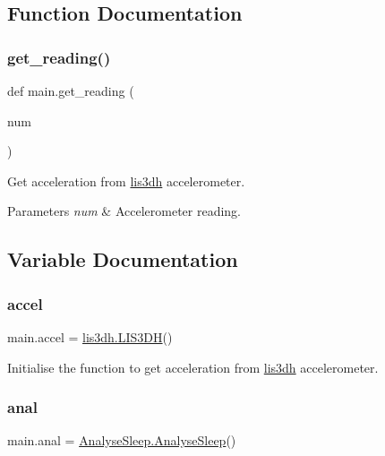\subsection{Function Documentation}
\mbox{\label{namespacemain_a8c1b4e8df74031b6ee2d0809895a7c87}} 
\subsubsection{\texorpdfstring{get\+\_\+reading()}{get\_reading()}}
{\footnotesize\ttfamily def main.\+get\+\_\+reading (\begin{DoxyParamCaption}\item[{}]{num }\end{DoxyParamCaption})}



Get acceleration from \mbox{\hyperlink{namespacelis3dh}{lis3dh}} accelerometer. 


\begin{DoxyParams}{Parameters}
{\em num} & Accelerometer reading. \\
\hline
\end{DoxyParams}


\subsection{Variable Documentation}
\mbox{\label{namespacemain_a8c8a40da45fbdc94330d48c7ed3ace09}} 
\subsubsection{\texorpdfstring{accel}{accel}}
{\footnotesize\ttfamily main.\+accel = \mbox{\hyperlink{classlis3dh_1_1_l_i_s3_d_h}{lis3dh.\+L\+I\+S3\+DH}}()}



Initialise the function to get acceleration from \mbox{\hyperlink{namespacelis3dh}{lis3dh}} accelerometer. 

\mbox{\label{namespacemain_a0503d58472af5003363eb9294405572d}} 
\subsubsection{\texorpdfstring{anal}{anal}}
{\footnotesize\ttfamily main.\+anal = \mbox{\hyperlink{class_analyse_sleep_1_1_analyse_sleep}{Analyse\+Sleep.\+Analyse\+Sleep}}()}



